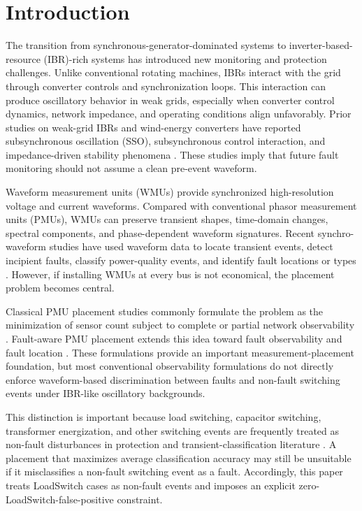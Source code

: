 \documentclass[conference]{IEEEtran}
\begin{document}
\section{Introduction}

The transition from synchronous-generator-dominated systems to inverter-based-resource (IBR)-rich systems has introduced new monitoring and protection challenges. Unlike conventional rotating machines, IBRs interact with the grid through converter controls and synchronization loops. This interaction can produce oscillatory behavior in weak grids, especially when converter control dynamics, network impedance, and operating conditions align unfavorably. Prior studies on weak-grid IBRs and wind-energy converters have reported subsynchronous oscillation (SSO), subsynchronous control interaction, and impedance-driven stability phenomena \cite{liu2017subsynchronous,yuan2020investigating,liu2017mechanism,liu2019frequency,sun2011impedance,wen2016impedance,chowdhury2017nonlinear,shair2022adaptive,azimi2022supplementary,yoon2024deep}. These studies imply that future fault monitoring should not assume a clean pre-event waveform.

Waveform measurement units (WMUs) provide synchronized high-resolution voltage and current waveforms. Compared with conventional phasor measurement units (PMUs), WMUs can preserve transient shapes, time-domain changes, spectral components, and phase-dependent waveform signatures. Recent synchro-waveform studies have used waveform data to locate transient events, detect incipient faults, classify power-quality events, and identify fault locations or types \cite{izadi2021synchronous,izadi2022synchronized,mansourlakouraj2023waveform}. However, if installing WMUs at every bus is not economical, the placement problem becomes central.

Classical PMU placement studies commonly formulate the problem as the minimization of sensor count subject to complete or partial network observability \cite{nuqui2005phasor,gou2008generalized,peng2006optimal,rakpenthai2007optimal,carvalho2018observability}. Fault-aware PMU placement extends this idea toward fault observability and fault location \cite{eissa2018hierarchical,pokharel2009optimal}. These formulations provide an important measurement-placement foundation, but most conventional observability formulations do not directly enforce waveform-based discrimination between faults and non-fault switching events under IBR-like oscillatory backgrounds.

This distinction is important because load switching, capacitor switching, transformer energization, and other switching events are frequently treated as non-fault disturbances in protection and transient-classification literature \cite{faiz2007adaptive,wang2003classification,shahrtash2006high,perera2008power,costa2010detection,hajibandeh2017classifications,sadeghkhani2016transient,bera2021discrimination,veerasamy2021lstm,zanjani2013high}. A placement that maximizes average classification accuracy may still be unsuitable if it misclassifies a non-fault switching event as a fault. Accordingly, this paper treats LoadSwitch cases as non-fault events and imposes an explicit zero-LoadSwitch-false-positive constraint.
\end{document}
